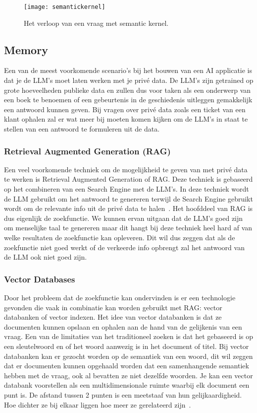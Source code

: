\begin{figure}
    \centering
    \texttt{[image: semantickernel]}
    \caption{Het verloop van een vraag met semantic kernel.}
    \label{fig:semanticKernel}
\end{figure}

\subsection{Memory}
Een van de meest voorkomende scenario's bij het bouwen van een AI applicatie is dat je de LLM's moet laten werken met je privé data. De LLM's zijn getrained op grote hoeveelheden publieke data en zullen dus voor taken als een onderwerp van een boek te benoemen of een gebeurtenis in de geschiedenis uitleggen gemakkelijk een antwoord kunnen geven. Bij vragen over privé data zoals een ticket van een klant ophalen zal er wat meer bij moeten komen kijken om de LLM's in staat te stellen van een antwoord te formuleren uit de data.

\subsubsection{Retrieval Augmented Generation (RAG)}
Een veel voorkomende techniek om de mogelijkheid te geven van met privé data te werken is Retrieval Augmented Generation of RAG. Deze techniek is gebaseerd op het combineren van een Search Engine met de LLM's. In deze techniek wordt de LLM gebruikt om het antwoord te genereren terwijl de Search Engine gebruikt wordt om de relevante info uit de privé data te halen~\autocite{Cantina2024}. 
Het hoofddeel van RAG is dus eigenlijk de zoekfunctie. We kunnen ervan uitgaan dat de LLM's goed zijn om menselijke taal te genereren maar dit hangt bij deze techniek heel hard af van welke resultaten de zoekfunctie kan opleveren. Dit wil dus zeggen dat als de zoekfunctie niet goed werkt of de verkeerde info opbrengt zal het antwoord van de LLM ook niet goed zijn. 

\subsubsection{Vector Databases}
Door het probleem dat de zoekfunctie kan ondervinden is er een technologie gevonden die vaak in combinatie kan worden gebruikt met RAG: vector databanken of vector indexen. Het idee van vector databanken is dat ze documenten kunnen opslaan en ophalen aan de hand van de gelijkenis van een vraag. Een van de limitaties van het traditioneel zoeken is dat het gebaseerd is op een sleutelwoord en of het woord aanwezig is in het document of titel. Bij vector databanken kan er gezocht worden op de semantiek van een woord, dit wil zeggen dat er documenten kunnen opgehaald worden dat een samenhangende semantiek hebben met de vraag, ook al bevatten ze niet dezelfde woorden. 
Je kan een vector databank voorstellen als een multidimensionale ruimte waarbij elk document een punt is. De afstand tussen 2 punten is een meetstaaf van hun gelijkaardigheid. Hoe dichter ze bij elkaar liggen hoe meer ze gerelateerd zijn~\autocite{Cantina2024}. 

